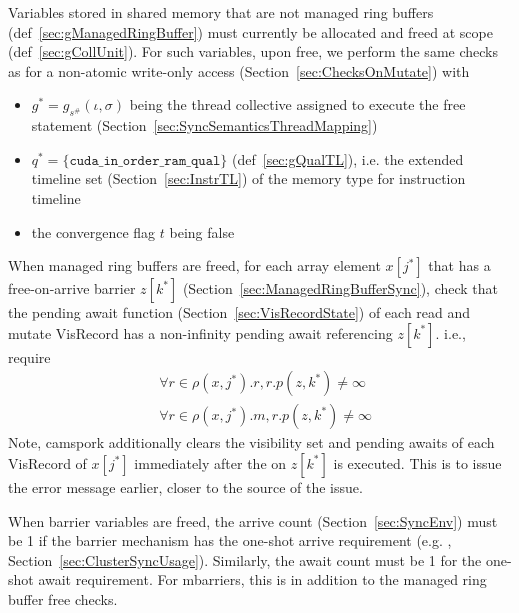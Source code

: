 

 Variables stored in shared memory that are not managed ring buffers (def~\ref{sec:gManagedRingBuffer}) must currently be allocated and freed at  scope (def~\ref{sec:gCollUnit}).
For such variables, upon free, we perform the same checks as for a non-atomic write-only access (Section~\ref{sec:ChecksOnMutate}) with
\begin{itemize}
  \item $g^* = g_{s^\#}(\iota, \sigma)$ being the thread collective assigned to execute the free statement (Section~\ref{sec:SyncSemanticsThreadMapping})
  \item $q^* = \{ \texttt{cuda\_in\_order\_ram\_qual} \}$ (def~\ref{sec:gQualTL}), i.e. the extended timeline set (Section~\ref{sec:InstrTL}) of the memory type for instruction timeline 
  \item the convergence flag $t$ being false
\end{itemize}

 When managed ring buffers are freed, for each array element $x[j^*]$ that has a free-on-arrive barrier $z[k^*]$ (Section~\ref{sec:ManagedRingBufferSync}), check that the pending await function (Section~\ref{sec:VisRecordState}) of each read and mutate \textsf{VisRecord} has a non-infinity pending await referencing $z[k^*]$.
i.e., require
\begin{align*}
  & \forall r \in \rho(x, j^*).r, r.p(z, k^*) \ne \infty \\
  & \forall r \in \rho(x, j^*).m, r.p(z, k^*) \ne \infty
\end{align*}
Note, camspork additionally clears the visibility set and pending awaits of each \textsf{VisRecord} of $x[j^*]$ immediately after the  on $z[k^*]$ is executed.
This is to issue the error message earlier, closer to the source of the issue.

 When barrier variables are freed, the arrive count (Section~\ref{sec:SyncEnv}) must be 1 if the barrier mechanism has the one-shot arrive requirement (e.g. , Section~\ref{sec:ClusterSyncUsage}).
Similarly, the await count must be 1 for the one-shot await requirement.
For mbarriers, this is in addition to the managed ring buffer free checks.

